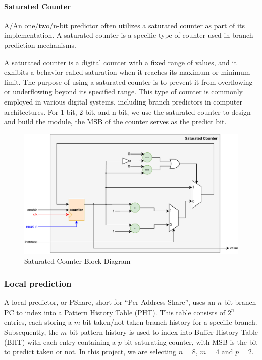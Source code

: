 \documentclass[12pt,a4paper,oneside]{book} %
\begin{document}

\paragraph*{Saturated Counter}

A/An one/two/n-bit predictor often utilizes a saturated counter as part of its implementation. A saturated counter is a specific type of counter used in branch prediction mechanisms.

A saturated counter is a digital counter with a fixed range of values, and it exhibits a behavior called saturation when it reaches its maximum or minimum limit. The purpose of using a saturated counter is to prevent it from overflowing or underflowing beyond its specified range. This type of counter is commonly employed in various digital systems, including branch predictors in computer architectures. For 1-bit, 2-bit, and n-bit, we use the saturated counter to design and build the module, the MSB of the counter serves as the predict bit.

\begin{figure}[H]
    \centering
    \includegraphics[width=.9\textwidth]{images/predictor/sat_counter.pdf}
    \caption{Saturated Counter Block Diagram}
\end{figure}

\subsubsection{Local prediction}
A local predictor, or PShare, short for ``Per Address Share'', uses an $n$-bit branch PC to index into a Pattern History Table (PHT). This table consists of $2^n$ entries, each storing a $m$-bit taken/not-taken branch history for a specific branch. Subsequently, the $m$-bit pattern history is used to index into Buffer History Table (BHT) with each entry containing a $p$-bit saturating counter, with MSB is the bit to predict taken or not. In this project, we are selecting $n=8$, $m=4$ and $p=2$.
\end{document}
